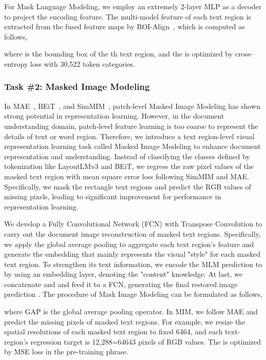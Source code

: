 \documentclass{article} \usepackage{iclr2023_conference,times}
\begin{document}
For Mask Language Modeling, we employ an extremely 2-layer MLP as a decoder to project the encoding feature. The multi-model feature of each text region is extracted from the fused feature maps  by ROI-Align~\cite{ren2015faster}, which is computed as follows,

where  is the bounding box of the th text region, and the  is optimized by cross-entropy loss with 30,522 token categories.

\subsubsection{Task \#2: Masked Image Modeling}
In MAE~\cite{he2021masked}, BEiT~\cite{bao2021beit}, and SimMIM~\cite{Xie00LBYD022}, patch-level Masked Image Modeling has shown strong potential in representation learning. However, in the document understanding domain, patch-level feature learning is too coarse to represent the details of text or word region. Therefore, we introduce a text region-level visual representation learning task called Masked Image Modeling to enhance document representation and understanding. Instead of classifying the classes defined by tokenization like LayoutLMv3 and BEiT, we regress the raw pixel values of the masked text region with mean square error loss following SimMIM and MAE. Specifically, we mask the rectangle text regions and predict the RGB values of missing pixels, leading to significant improvement for performance in representation learning.

We develop a Fully Convolutional Network (FCN) with Transpose Convolution to carry out the document image reconstruction of masked text regions. Specifically, we apply the global average pooling to aggregate each text region's feature and generate the embedding  that mainly represents the visual "style" for each masked text region. To strengthen its text information, we encode the MLM prediction  to  by using an embedding layer, denoting the "content" knowledge. At last, we concatenate  and  and feed it to a FCN, generating the final restored image prediction . The procedure of Mask Image Modeling can be formulated as follows,



where GAP is the global average pooling operator. In MIM, we follow MAE and predict the missing pixels of masked text regions. For example, we resize the spatial resolutions of each masked text region to fixed 6464, and each text-region's regression target is 12,288=64643 pixels of RGB values. The  is optimized by MSE loss in the pre-training phrase.
\end{document}
